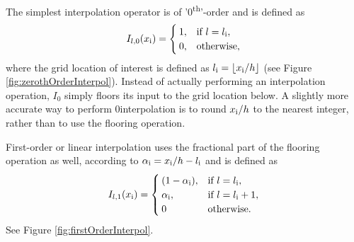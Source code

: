 The simplest interpolation operator is of '0\textsuperscript{th}'-order and is defined as
\begin{equation}\label{eq:zerothOrderI}
    I_{l,0}(x_{\text{i}}) = \begin{cases}
        1, & \text{if}\ l = l_{\text{i}},\\
        0, & \text{otherwise},
    \end{cases}
\end{equation}
where the grid location of interest is defined as $l_\itxt = \floor[x_\itxt / h]$ (see Figure \ref{fig:zerothOrderInterpol}). Instead of actually performing an interpolation operation, $I_0$ simply floors its input to the grid location below. 
%
% 
%
A slightly more accurate way to perform 0\thOrder interpolation is to round $x_{\text{i}}/h$ to the nearest integer, rather than to use the flooring operation. 

First-order or linear interpolation uses the fractional part of the flooring operation as well, according to $\alpha_{\text{i}} = x_{\text{i}} / h - l_{\text{i}}$ and is defined as
\begin{equation}\label{eq:firstOrderI}
    I_{l,1}(x_{\text{i}}) = \begin{cases}
        (1-\alpha_{\text{i}}), & \text{if}\ l = l_{\text{i}},\\
        \alpha_{\text{i}} , & \text{if}\ l = l_{\text{i}} + 1,\\
        0 & \text{otherwise.}
    \end{cases}
\end{equation}
See Figure \ref{fig:firstOrderInterpol}. 

